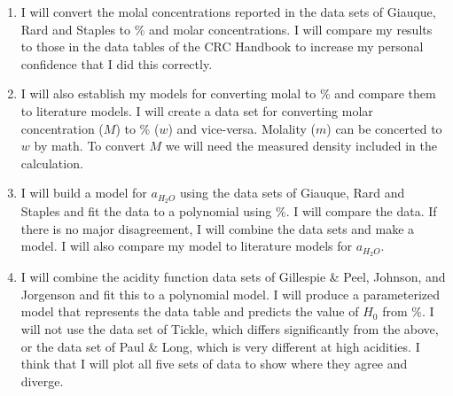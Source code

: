 \documentclass[]{tufte-handout}
\begin{document}
%
\begin{enumerate}

\item I will convert the molal concentrations reported in the data sets of Giauque, Rard and Staples to \% and molar concentrations. I will compare my results to those in the data tables of the CRC Handbook to increase my personal confidence that I did this correctly. 

\item I will also establish my models for converting molal to \% and compare them to literature models. I will create a data set for converting molar concentration ($M$) to \% ($w$) and vice-versa. Molality ($m$) can be concerted to $w$ by math. To convert $M$ we will need the measured density included in the calculation. 

\item I will build a model for $a_{H_2O}$ using the data sets of Giauque, Rard and Staples and fit the data to a polynomial using \%. I will compare the data. If there is no major disagreement, I will combine the data sets and make a model. I will also compare my model to literature models for $a_{H_2O}$. 

\item I will combine the acidity function data sets of Gillespie \& Peel, Johnson, and Jorgenson and fit this to a polynomial model. I will produce a parameterized model that represents the data table and predicts the value of $H_0$ from \%. I will not use the data set of Tickle, which differs significantly from the above, or the data set of Paul \& Long, which is very different at high acidities. I think that I will plot all five sets of data to show where they agree and diverge. 


\end{enumerate}
\end{document}
